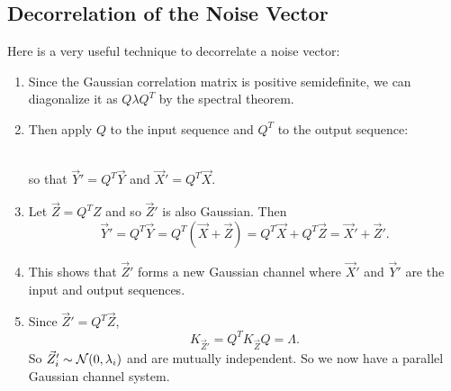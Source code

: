 \documentclass[../main.tex]{subfiles}
\begin{document}
\subsection{Decorrelation of the Noise Vector}
Here is a very useful technique to decorrelate a noise vector: \begin{enumerate}
    \item Since the Gaussian correlation matrix is positive semidefinite, we can diagonalize it as $Q\lambda Q^T$ by the spectral theorem.
    \item Then apply $Q$ to the input sequence and $Q^T$ to the output sequence: \\
    \\
so that $\vec Y'= Q^T \vec Y$ and $\vec X' = Q^T\vec X$.
\item Let $\vec Z =Q^T Z$ and so $\vec Z'$ is also Gaussian. Then \[
\vec Y'=Q^T \vec Y=Q^T(\vec X+\vec Z)=Q^T \vec X+Q^T\vec Z= \vec X'+\vec Z'.
\]
\item This shows that $\vec Z'$ forms a new Gaussian channel where $\vec X'$ and $\vec Y'$ are the input and output sequences. 
\item Since $\vec Z'= Q^T \vec Z$, \[
K_{\vec Z'}=Q^TK_{\vec Z}Q=\Lambda.
\]
So $\vec Z_i'\sim \mathcal{N}(0,\lambda_i)$ and are mutually independent. So we now have a parallel Gaussian channel system.
\end{enumerate}
\end{document}
